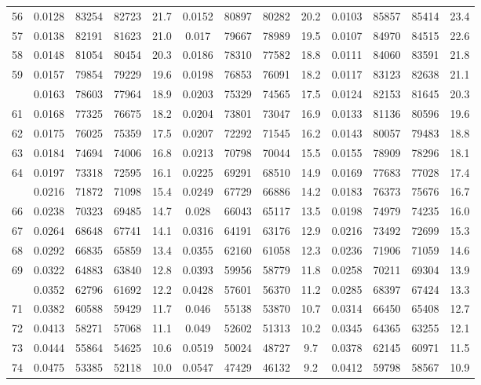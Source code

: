 \documentclass[
  14pt,
]{article}
\begin{document}
\begin{longtable}[t]{lcccccccccccc}
56 & 0.0128 & 83254 & 82723 & 21.7 & 0.0152 & 80897 & 80282 & 20.2 & 0.0103 & 85857 & 85414 & 23.4\\
57 & 0.0138 & 82191 & 81623 & 21.0 & 0.017 & 79667 & 78989 & 19.5 & 0.0107 & 84970 & 84515 & 22.6\\
58 & 0.0148 & 81054 & 80454 & 20.3 & 0.0186 & 78310 & 77582 & 18.8 & 0.0111 & 84060 & 83591 & 21.8\\
59 & 0.0157 & 79854 & 79229 & 19.6 & 0.0198 & 76853 & 76091 & 18.2 & 0.0117 & 83123 & 82638 & 21.1\\
\addlinespace
60 & 0.0163 & 78603 & 77964 & 18.9 & 0.0203 & 75329 & 74565 & 17.5 & 0.0124 & 82153 & 81645 & 20.3\\
61 & 0.0168 & 77325 & 76675 & 18.2 & 0.0204 & 73801 & 73047 & 16.9 & 0.0133 & 81136 & 80596 & 19.6\\
62 & 0.0175 & 76025 & 75359 & 17.5 & 0.0207 & 72292 & 71545 & 16.2 & 0.0143 & 80057 & 79483 & 18.8\\
63 & 0.0184 & 74694 & 74006 & 16.8 & 0.0213 & 70798 & 70044 & 15.5 & 0.0155 & 78909 & 78296 & 18.1\\
64 & 0.0197 & 73318 & 72595 & 16.1 & 0.0225 & 69291 & 68510 & 14.9 & 0.0169 & 77683 & 77028 & 17.4\\
\addlinespace
65 & 0.0216 & 71872 & 71098 & 15.4 & 0.0249 & 67729 & 66886 & 14.2 & 0.0183 & 76373 & 75676 & 16.7\\
66 & 0.0238 & 70323 & 69485 & 14.7 & 0.028 & 66043 & 65117 & 13.5 & 0.0198 & 74979 & 74235 & 16.0\\
67 & 0.0264 & 68648 & 67741 & 14.1 & 0.0316 & 64191 & 63176 & 12.9 & 0.0216 & 73492 & 72699 & 15.3\\
68 & 0.0292 & 66835 & 65859 & 13.4 & 0.0355 & 62160 & 61058 & 12.3 & 0.0236 & 71906 & 71059 & 14.6\\
69 & 0.0322 & 64883 & 63840 & 12.8 & 0.0393 & 59956 & 58779 & 11.8 & 0.0258 & 70211 & 69304 & 13.9\\
\addlinespace
70 & 0.0352 & 62796 & 61692 & 12.2 & 0.0428 & 57601 & 56370 & 11.2 & 0.0285 & 68397 & 67424 & 13.3\\
71 & 0.0382 & 60588 & 59429 & 11.7 & 0.046 & 55138 & 53870 & 10.7 & 0.0314 & 66450 & 65408 & 12.7\\
72 & 0.0413 & 58271 & 57068 & 11.1 & 0.049 & 52602 & 51313 & 10.2 & 0.0345 & 64365 & 63255 & 12.1\\
73 & 0.0444 & 55864 & 54625 & 10.6 & 0.0519 & 50024 & 48727 & 9.7 & 0.0378 & 62145 & 60971 & 11.5\\
74 & 0.0475 & 53385 & 52118 & 10.0 & 0.0547 & 47429 & 46132 & 9.2 & 0.0412 & 59798 & 58567 & 10.9\\

\end{longtable}
\end{document}
